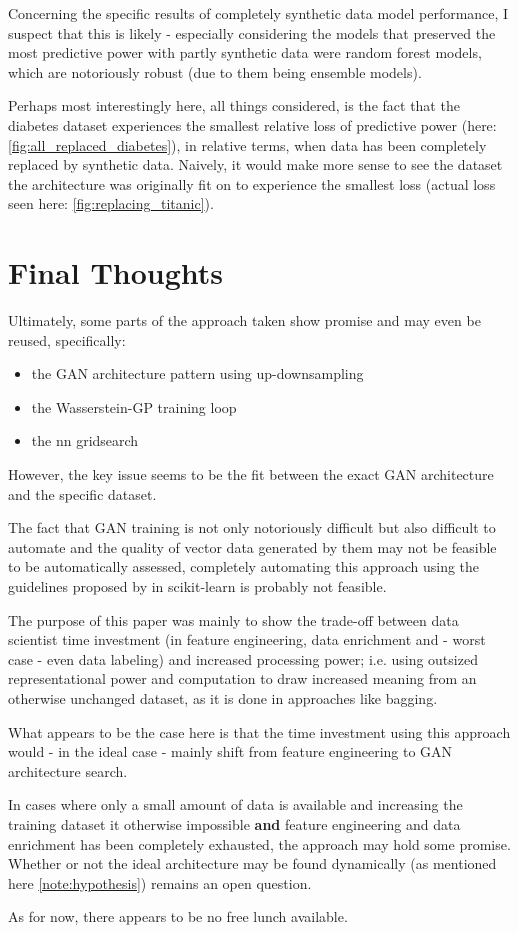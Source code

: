 Concerning the specific results of completely synthetic data model performance, I suspect that this is likely - especially considering the models that preserved the most predictive power with partly synthetic data were random forest models, which are notoriously robust (due to them being ensemble models).

Perhaps most interestingly here, all things considered, is the fact that the diabetes dataset experiences the smallest relative loss of predictive power (here: \ref{fig:all_replaced_diabetes}), in relative terms, when data has been completely replaced by synthetic data. Naively, it would make more sense to see the dataset the architecture was originally fit on to experience the smallest loss (actual loss seen here: \ref{fig:replacing_titanic}).

\pagebreak

\section{Final Thoughts}

Ultimately, some parts of the approach taken show promise and may even be reused, specifically:

\begin{itemize}
	\item the \ac{GAN} architecture pattern using up-downsampling
	\item the Wasserstein-GP training loop
	\item the \ac{nn} gridsearch
\end{itemize}

However, the key issue seems to be the fit between the exact \ac{GAN} architecture and the specific dataset.

The fact that \ac{GAN} training is not only notoriously difficult but also difficult to automate and the quality of vector data generated by them may not be feasible to be automatically assessed, completely automating this approach using the guidelines proposed by \cite{buitinck2013api} in scikit-learn is probably not feasible.

The purpose of this paper was mainly to show the trade-off between data scientist time investment (in feature engineering, data enrichment and - worst case - even data labeling) and increased processing power; i.e. using outsized representational power and computation to draw increased meaning from an otherwise unchanged dataset, as it is done in approaches like \ac{bagging}.

What appears to be the case here is that the time investment using this approach would - in the ideal case - mainly shift from feature engineering to \ac{GAN} architecture search.

In cases where only a small amount of data is available and increasing the training dataset it otherwise impossible \textbf{and} feature engineering and data enrichment has been completely exhausted, the approach may hold some promise. Whether or not the ideal architecture may be found dynamically (as mentioned here \ref{note:hypothesis}) remains an open question.

As for now, there appears to be no free lunch available.

\pagebreak
